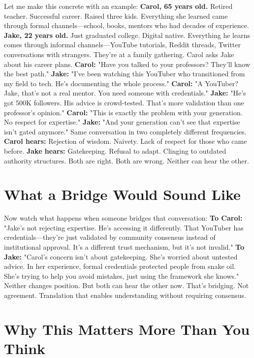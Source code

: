 Let me make this concrete with an example:
\textbf{Carol, 65 years old.} Retired teacher. Successful career. Raised three kids. Everything she learned came through formal channels—school, books, mentors who had decades of experience.
\textbf{Jake, 22 years old.} Just graduated college. Digital native. Everything he learns comes through informal channels—YouTube tutorials, Reddit threads, Twitter conversations with strangers.
They're at a family gathering. Carol asks Jake about his career plans.
\textbf{Carol:} "Have you talked to your professors? They'll know the best path."
\textbf{Jake:} "I've been watching this YouTuber who transitioned from my field to tech. He's documenting the whole process."
\textbf{Carol:} "A YouTuber? Jake, that's not a real mentor. You need someone with credentials."
\textbf{Jake:} "He's got 500K followers. His advice is crowd-tested. That's more validation than one professor's opinion."
\textbf{Carol:} "This is exactly the problem with your generation. No respect for expertise."
\textbf{Jake:} "And your generation can't see that expertise isn't gated anymore."
Same conversation in two completely different frequencies.
\textbf{Carol hears:} Rejection of wisdom. Naivety. Lack of respect for those who came before.
\textbf{Jake hears:} Gatekeeping. Refusal to adapt. Clinging to outdated authority structures.
Both are right. Both are wrong. Neither can hear the other.

\section{What a Bridge Would Sound Like}

Now watch what happens when someone bridges that conversation:
\textbf{To Carol:} "Jake's not rejecting expertise. He's accessing it differently. That YouTuber has credentials—they're just validated by community consensus instead of institutional approval. It's a different trust mechanism, but it's not invalid."
\textbf{To Jake:} "Carol's concern isn't about gatekeeping. She's worried about untested advice. In her experience, formal credentials protected people from snake oil. She's trying to help you avoid mistakes, just using the framework she knows."
Neither changes position. But both can hear the other now.
That's bridging. Not agreement. Translation that enables understanding without requiring consensus.

\section{Why This Matters More Than You Think}

